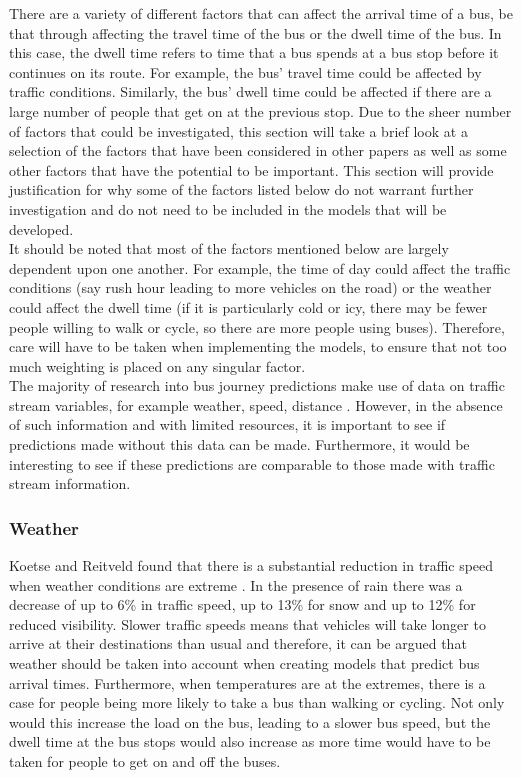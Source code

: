 There are a variety of different factors that can affect the arrival time of a bus, be that through affecting the travel time of the bus or the dwell time of the bus. In this case, the dwell time refers to time that a bus spends at a bus stop before it continues on its route. For example, the bus' travel time could be affected by traffic conditions. Similarly, the bus' dwell time could be affected if there are a large number of people that get on at the previous stop. Due to the sheer number of factors that could be investigated, this section will take a brief look at a selection of the factors that have been considered in other papers as well as some other factors that have the potential to be important. This section will provide justification for why some of the factors listed below do not warrant further investigation and do not need to be included in the models that will be developed. \\

It should be noted that most of the factors mentioned below are largely dependent upon one another. For example, the time of day could affect the traffic conditions (say rush hour leading to more vehicles on the road) or the weather could affect the dwell time (if it is particularly cold or icy, there may be fewer people willing to walk or cycle, so there are more people using buses). Therefore, care will have to be taken when implementing the models, to ensure that not too much weighting is placed on any singular factor. \\

The majority of research into bus journey predictions make use of data on traffic stream variables, for example weather, speed, distance \cite{dynamic-gps}. However, in the absence of such information and with limited resources, it is important to see if predictions made without this data can be made. Furthermore, it would be interesting to see if these predictions are comparable to those made with traffic stream information.

\subsubsection{Weather}

Koetse and Reitveld found that there is a substantial reduction in traffic speed when weather conditions are extreme \cite{weather-transport-effect}. In the presence of rain there was a decrease of up to 6\% in traffic speed, up to 13\% for snow and up to 12\% for reduced visibility. Slower traffic speeds means that vehicles will take longer to arrive at their destinations than usual and therefore, it can be argued that weather should be taken into account when creating models that predict bus arrival times. Furthermore, when temperatures are at the extremes, there is a case for people being more likely to take a bus than walking or cycling. Not only would this increase the load on the bus, leading to a slower bus speed, but the dwell time at the bus stops would also increase as more time would have to be taken for people to get on and off the buses. \\

